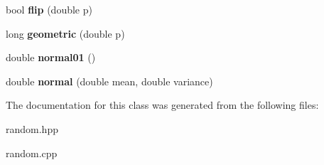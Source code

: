 \begin{DoxyCompactItemize}
\item 
\hypertarget{classrandomG_a4b7c476e7fe444a773cc74f32bd499c8}{bool {\bfseries flip} (double p)}\label{classrandomG_a4b7c476e7fe444a773cc74f32bd499c8}

\item 
\hypertarget{classrandomG_a39d7cb65478945cc2d14194ecd1950eb}{long {\bfseries geometric} (double p)}\label{classrandomG_a39d7cb65478945cc2d14194ecd1950eb}

\item 
\hypertarget{classrandomG_a55c882e05bc3c219e48ed7af2875f6e5}{double {\bfseries normal01} ()}\label{classrandomG_a55c882e05bc3c219e48ed7af2875f6e5}

\item 
\hypertarget{classrandomG_a08bb144508a1d82e45e67b09cb333569}{double {\bfseries normal} (double mean, double variance)}\label{classrandomG_a08bb144508a1d82e45e67b09cb333569}

\end{DoxyCompactItemize}


\-The documentation for this class was generated from the following files\-:\begin{DoxyCompactItemize}
\item 
random.\-hpp\item 
random.\-cpp\end{DoxyCompactItemize}
